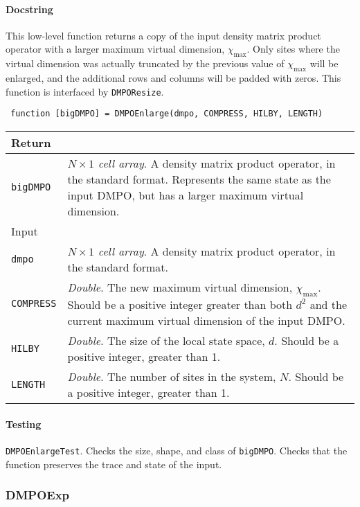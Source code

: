  \paragraph{Docstring} This low-level function returns a copy of the input density matrix product operator with a larger maximum virtual dimension, \(\chi_{\mathrm{max}}\). Only sites where the virtual dimension was actually truncated by the previous value of \(\chi_{\mathrm{max}}\) will be enlarged, and the additional rows and columns will be padded with zeros. This function is interfaced by \lstinline$DMPOResize$.
 \begin{lstlisting} 
 function [bigDMPO] = DMPOEnlarge(dmpo, COMPRESS, HILBY, LENGTH) \end{lstlisting}
 \begin{longtabu}{X[1,1]X[4,1]}
 \hline
 Return & \\ \hline
 \lstinline$bigDMPO$ & \emph{\(N \times 1\) cell array}. A density matrix product operator, in the standard format. Represents the same state as the input DMPO, but has a larger maximum virtual dimension. \\ \hline
 Input & \\ \hline
 \lstinline$dmpo$ & \emph{\(N \times 1\) cell array}. A density matrix product operator, in the standard format. \\
 \lstinline$COMPRESS$ & \emph{Double}. The new maximum virtual dimension, \(\chi_{\mathrm{max}}\). Should be a positive integer greater than both \(d^{2}\) and the current maximum virtual dimension of the input DMPO. \\
 \lstinline$HILBY$ & \emph{Double}. The size of the local state space, \(d\). Should be a positive integer, greater than 1. \\
 \lstinline$LENGTH$ & \emph{Double}. The number of sites in the system, \(N\). Should be a positive integer, greater than 1. \\
 \hline
 \end{longtabu}
 \paragraph{Testing} \lstinline$DMPOEnlargeTest$. Checks the size, shape, and class of \lstinline$bigDMPO$. Checks that the function preserves the trace and state of the input. 
 
 \subsubsection{DMPOExp}
